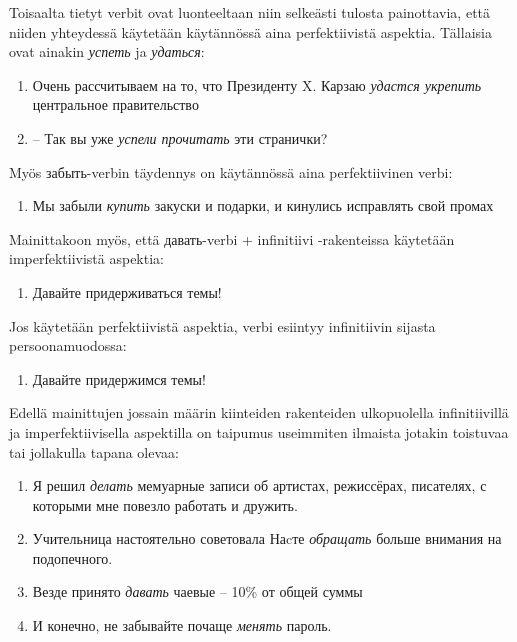 \documentclass[]{scrreprt}
\providecommand{\tightlist}{%
  \setlength{\itemsep}{0pt}\setlength{\parskip}{0pt}}
\begin{document}
Toisaalta tietyt verbit ovat luonteeltaan niin selkeästi tulosta
painottavia, että niiden yhteydessä käytetään käytännössä aina
perfektiivistä aspektia. Tällaisia ovat ainakin \emph{успеть} ja
\emph{удаться}:

\begin{enumerate}
\def\labelenumi{(\arabic{enumi})}
\setcounter{enumi}{335}
\tightlist
\item
  Очень рассчитываем на то, что Президенту X. Карзаю \emph{удастся
  укрепить} центральное правительство
\item
  -- Так вы уже \emph{успели прочитать} эти странички?
\end{enumerate}

Myös забыть-verbin täydennys on käytännössä aina perfektiivinen verbi:

\begin{enumerate}
\def\labelenumi{(\arabic{enumi})}
\setcounter{enumi}{337}
\tightlist
\item
  Мы забыли \emph{купить} закуски и подарки, и кинулись исправлять свой
  промах
\end{enumerate}

Mainittakoon myös, että давать-verbi + infinitiivi -rakenteissa
käytetään imperfektiivistä aspektia:

\begin{enumerate}
\def\labelenumi{(\arabic{enumi})}
\setcounter{enumi}{338}
\tightlist
\item
  Давайте придерживаться темы!
\end{enumerate}

Jos käytetään perfektiivistä aspektia, verbi esiintyy infinitiivin
sijasta persoonamuodossa:

\begin{enumerate}
\def\labelenumi{(\arabic{enumi})}
\setcounter{enumi}{339}
\tightlist
\item
  Давайте придержимся темы!
\end{enumerate}

Edellä mainittujen jossain määrin kiinteiden rakenteiden ulkopuolella
infinitiivillä ja imperfektiivisella aspektilla on taipumus useimmiten
ilmaista jotakin toistuvaa tai jollakulla tapana olevaa:

\begin{enumerate}
\def\labelenumi{(\arabic{enumi})}
\setcounter{enumi}{340}
\tightlist
\item
  Я решил \emph{делать} мемуарные записи об артистах, режиссёрах,
  писателях, с которыми мне повезло работать и дружить.
\item
  Учительница настоятельно советовала Наcте \emph{обращать} больше
  внимания на подопечного.
\item
  Везде принято \emph{давать} чаевые -- 10\% от общей суммы
\item
  И конечно, не забывайте почаще \emph{менять} пароль.
\end{enumerate}
\end{document}

